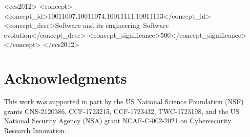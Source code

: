 \documentclass[sigconf,screen]{acmart}
\begin{document}

\begin{CCSXML}
<ccs2012>
<concept>
<concept_id>10011007.10011074.10011111.10011113</concept_id>
<concept_desc>Software and its engineering~Software evolution</concept_desc>
<concept_significance>500</concept_significance>
</concept>
</ccs2012>
\end{CCSXML}




\maketitle

















\section*{Acknowledgments}
This work was supported in part by the US National Science Foundation
(NSF) grants CNS-2120386, CCF-1723215, CCF-1723432, TWC-1723198, and
the US National Security Agency (NSA) grant NCAE-C-002-2021 on
Cybersecurity Research Innovation.


\newpage

\balance

%
%



\end{document}
